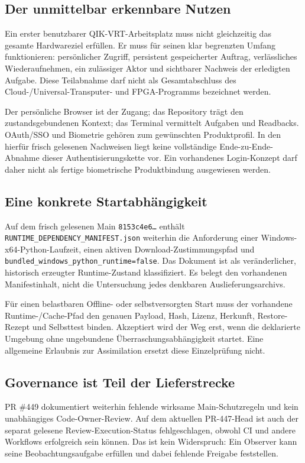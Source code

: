 \begin{cols}
\subsection*{Der unmittelbar erkennbare Nutzen}
Ein erster benutzbarer QIK-VRT-Arbeitsplatz muss nicht gleichzeitig das gesamte Hardwareziel erfüllen. Er muss für seinen klar begrenzten Umfang funktionieren: persönlicher Zugriff, persistent gespeicherter Auftrag, verlässliches Wiederaufnehmen, ein zulässiger Aktor und sichtbarer Nachweis der erledigten Aufgabe. Diese Teilabnahme darf nicht als Gesamtabschluss des Cloud-/Universal-Transputer- und FPGA-Programms bezeichnet werden.

Der persönliche Browser ist der Zugang; das Repository trägt den zustandsgebundenen Kontext; das Terminal vermittelt Aufgaben und Readbacks. OAuth/SSO und Biometrie gehören zum gewünschten Produktprofil. In den hierfür frisch gelesenen Nachweisen liegt keine vollständige Ende-zu-Ende-Abnahme dieser Authentisierungskette vor. Ein vorhandenes Login-Konzept darf daher nicht als fertige biometrische Produktbindung ausgewiesen werden.

\subsection*{Eine konkrete Startabhängigkeit}
Auf dem frisch gelesenen Main \texttt{8153c4e6…} enthält \texttt{RUNTIME\_DEPENDENCY\_MANIFEST.json} weiterhin die Anforderung einer Windows-x64-Python-Laufzeit, einen aktiven Download-Zustimmungspfad und \texttt{bundled\_windows\_python\_runtime=false}. Das Dokument ist als veränderlicher, historisch erzeugter Runtime-Zustand klassifiziert. Es belegt den vorhandenen Manifestinhalt, nicht die Untersuchung jedes denkbaren Auslieferungsarchivs. 

Für einen belastbaren Offline- oder selbstversorgten Start muss der vorhandene Runtime-/Cache-Pfad den genauen Payload, Hash, Lizenz, Herkunft, Restore-Rezept und Selbsttest binden. Akzeptiert wird der Weg erst, wenn die deklarierte Umgebung ohne ungebundene Überraschungsabhängigkeit startet. Eine allgemeine Erlaubnis zur Assimilation ersetzt diese Einzelprüfung nicht.

\subsection*{Governance ist Teil der Lieferstrecke}
PR \#449 dokumentiert weiterhin fehlende wirksame Main-Schutzregeln und kein unabhängiges Code-Owner-Review. Auf dem aktuellen PR-447-Head ist auch der separat gelesene Review-Execution-Status fehlgeschlagen, obwohl CI und andere Workflows erfolgreich sein können. Das ist kein Widerspruch: Ein Observer kann seine Beobachtungsaufgabe erfüllen und dabei fehlende Freigabe feststellen. 


\end{cols}
